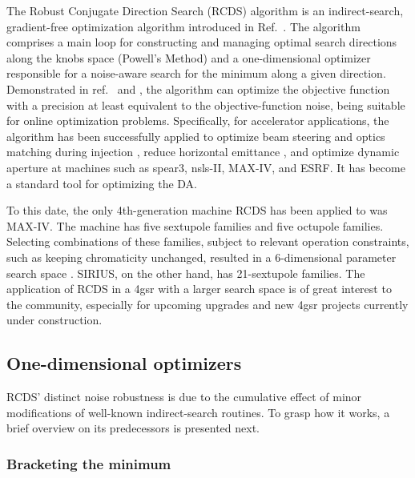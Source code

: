 The Robust Conjugate Direction Search (\gls*{RCDS}) algorithm is an indirect-search, gradient-free optimization algorithm introduced in Ref.~\cite{huang_algorithm_2013}. The algorithm comprises a main loop for constructing and managing optimal search directions along the knobs space (Powell's Method) and a one-dimensional optimizer responsible for a noise-aware search for the minimum along a given direction. Demonstrated in ref.~\cite{huang_algorithm_2013} and \cite[section 7.3.3]{huang_beam-based_2019}, the algorithm can optimize the objective function with a precision at least equivalent to the objective-function noise, being suitable for online optimization problems. Specifically, for accelerator applications, the algorithm has been successfully applied to optimize beam steering and optics matching during injection \cite{huang_algorithm_2013}, reduce horizontal emittance \cite{huang_algorithm_2013, huang_online_2015}, and optimize dynamic aperture \cite{huang_algorithm_2013, huang_online_2015,liuzzo_rcds_2016,olsson_online_2018,yang_online_2022} at machines such as \acrshort*{spear}3, \acrshort*{nsls}-II, MAX-IV, and \acrshort*{ESRF}. It has become a standard tool for optimizing the \gls*{DA}.

To this date, the only 4th-generation machine \gls*{RCDS} has been applied to was MAX-IV. The machine has five sextupole families and five octupole families. Selecting combinations of these families, subject to relevant operation constraints, such as keeping chromaticity unchanged, resulted in a 6-dimensional parameter search space \cite{olsson_online_2018}. SIRIUS, on the other hand, has 21-sextupole families. The application of \gls*{RCDS} in a \gls*{4gsr} with a larger search space is of great interest to the community, especially for upcoming upgrades and new \gls*{4gsr} projects currently under construction.

\subsection{One-dimensional optimizers}
\gls*{RCDS}' distinct noise robustness is due to the cumulative effect of minor modifications of well-known indirect-search routines. To grasp how it works, a brief overview on its predecessors is presented next.
\subsubsection{Bracketing the minimum}


